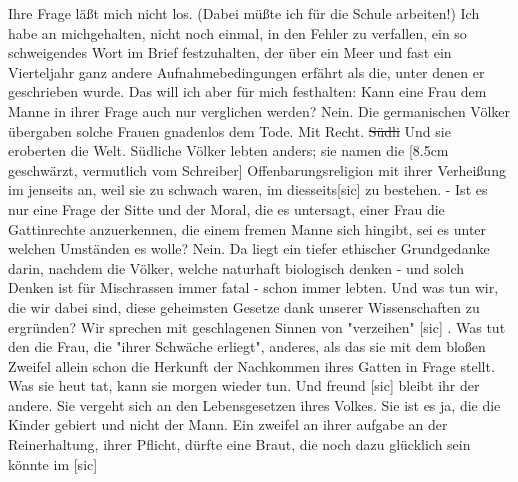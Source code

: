 \def\day{In der Mittagsruhe 20. Mai 1944}
\mktitle

Ihre Frage l\"{a}{\ss}t mich nicht los.
(Dabei m\"{u}{\ss}te ich f\"{u}r die Schule arbeiten!)
Ich habe an michgehalten, nicht noch einmal, in den Fehler zu verfallen, ein so schweigendes Wort im Brief festzuhalten, der \"{u}ber ein Meer und fast ein Vierteljahr ganz andere Aufnahmebedingungen erf\"{a}hrt als die, unter denen er geschrieben wurde.
Das will ich aber f\"{u}r mich festhalten: Kann eine Frau dem Manne in ihrer Frage auch nur verglichen werden?
Nein.
Die germanischen V\"{o}lker \"{u}bergaben solche Frauen gnadenlos dem Tode.
Mit Recht.
\st{S\"{u}dli} Und sie eroberten die Welt.
S\"{u}dliche V\"{o}lker lebten anders; sie namen die {\color{red} [8.5cm geschw\"{a}rzt, vermutlich vom Schreiber] Offenbarungsreligion mit ihrer Verhei{\ss}ung im jenseits an, weil sie zu schwach waren, im diesseits[sic] } zu bestehen.
- Ist es nur eine Frage der Sitte und der Moral, die es untersagt, einer Frau die Gattinrechte anzuerkennen, die einem fremen Manne sich hingibt, sei es unter welchen Umst\"{a}nden es wolle?
Nein.
Da liegt ein tiefer ethischer Grundgedanke darin, nachdem die V\"{o}lker, welche naturhaft biologisch denken - und solch Denken ist f\"{u}r Mischrassen immer fatal - schon immer lebten.
Und was tun wir, die wir dabei sind, diese geheimsten Gesetze dank unserer Wissenschaften zu ergr\"{u}nden?
Wir sprechen mit geschlagenen Sinnen von "verzeihen"{\color{red} [sic] }.
Was tut den die Frau, die "ihrer Schw\"{a}che erliegt", anderes, als das sie mit dem blo{\ss}en Zweifel allein schon die Herkunft der Nachkommen ihres Gatten in Frage stellt.
Was sie heut tat, kann sie morgen wieder tun.
Und freund{\color{red} [sic] } bleibt ihr der andere.
Sie vergeht sich an den Lebensgesetzen ihres Volkes.
Sie ist es ja, die die Kinder gebiert und nicht der Mann.
Ein zweifel an ihrer aufgabe an der Reinerhaltung, ihrer Pflicht, d\"{u}rfte eine Braut, die noch dazu gl\"{u}cklich sein k\"{o}nnte im{\color{red} [sic] }

\clearpage
